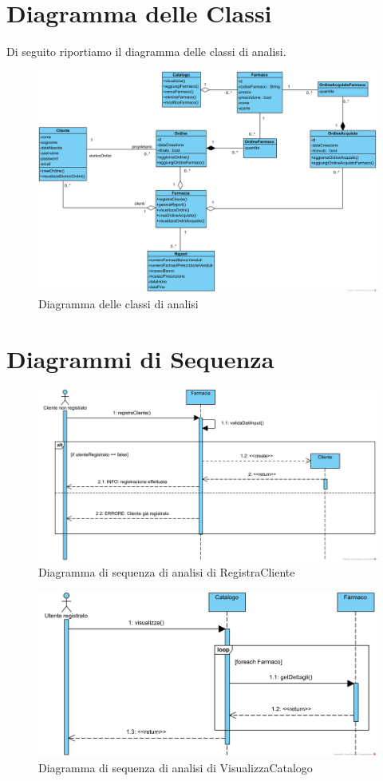 \section{Diagramma delle Classi}
Di seguito riportiamo il diagramma delle classi di analisi.
\begin{figure}[!ht]
	\centering
	\includegraphics[width=\linewidth]{assets/ClassDiagramAnalisi.png}
	\caption{Diagramma delle classi di analisi}
\end{figure}

\section{Diagrammi di Sequenza}

\begin{figure}[!hbp]
	\centering
	\includegraphics[width=0.8\linewidth]{assets/sequence_analisi/SequenceAnalisiRegistraCliente.png}
	\caption{Diagramma di sequenza di analisi di RegistraCliente}
\end{figure}

\begin{figure}[!hbp]
	\centering
	\includegraphics[width=0.8\linewidth]{assets/sequence_analisi/SequenceAnalisiVisualizzaCatalogo.png}
	\caption{Diagramma di sequenza di analisi di VisualizzaCatalogo}
\end{figure}


